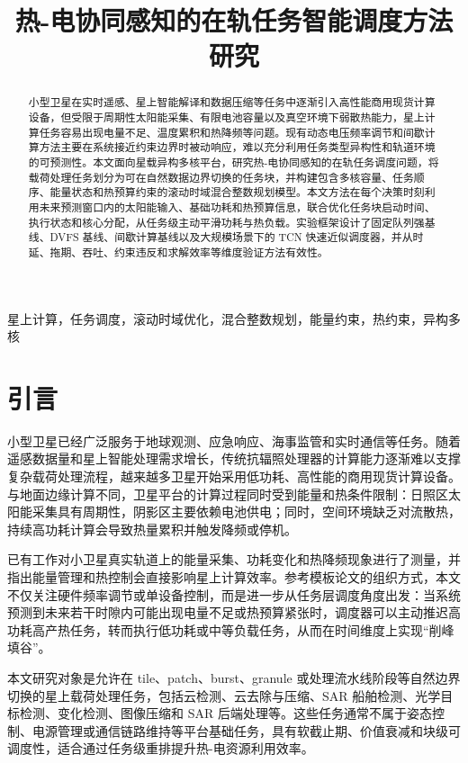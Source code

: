 \documentclass[conference]{IEEEtran}
\title{热-电协同感知的在轨任务智能调度方法研究}
\author{
\IEEEauthorblockN{作者姓名}
\IEEEauthorblockA{
学院/单位名称\\
邮箱：yourname@example.com
}
}
\begin{document}
\maketitle

\begin{abstract}
小型卫星在实时遥感、星上智能解译和数据压缩等任务中逐渐引入高性能商用现货计算设备，但受限于周期性太阳能采集、有限电池容量以及真空环境下弱散热能力，星上计算任务容易出现电量不足、温度累积和热降频等问题。现有动态电压频率调节和间歇计算方法主要在系统接近约束边界时被动响应，难以充分利用任务类型异构性和轨道环境的可预测性。本文面向星载异构多核平台，研究热-电协同感知的在轨任务调度问题，将载荷处理任务划分为可在自然数据边界切换的任务块，并构建包含多核容量、任务顺序、能量状态和热预算约束的滚动时域混合整数规划模型。本文方法在每个决策时刻利用未来预测窗口内的太阳能输入、基础功耗和热预算信息，联合优化任务块启动时间、执行状态和核心分配，从任务级主动平滑功耗与热负载。实验框架设计了固定队列强基线、DVFS 基线、间歇计算基线以及大规模场景下的 TCN 快速近似调度器，并从时延、拖期、吞吐、约束违反和求解效率等维度验证方法有效性。
\end{abstract}

\begin{IEEEkeywords}
星上计算，任务调度，滚动时域优化，混合整数规划，能量约束，热约束，异构多核
\end{IEEEkeywords}

\section{引言}

小型卫星已经广泛服务于地球观测、应急响应、海事监管和实时通信等任务。随着遥感数据量和星上智能处理需求增长，传统抗辐照处理器的计算能力逐渐难以支撑复杂载荷处理流程，越来越多卫星开始采用低功耗、高性能的商用现货计算设备。与地面边缘计算不同，卫星平台的计算过程同时受到能量和热条件限制：日照区太阳能采集具有周期性，阴影区主要依赖电池供电；同时，空间环境缺乏对流散热，持续高功耗计算会导致热量累积并触发降频或停机。

已有工作对小卫星真实轨道上的能量采集、功耗变化和热降频现象进行了测量，并指出能量管理和热控制会直接影响星上计算效率。参考模板论文的组织方式，本文不仅关注硬件频率调节或单设备控制，而是进一步从任务层调度角度出发：当系统预测到未来若干时隙内可能出现电量不足或热预算紧张时，调度器可以主动推迟高功耗高产热任务，转而执行低功耗或中等负载任务，从而在时间维度上实现“削峰填谷”。

本文研究对象是允许在 tile、patch、burst、granule 或处理流水线阶段等自然边界切换的星上载荷处理任务，包括云检测、云去除与压缩、SAR 船舶检测、光学目标检测、变化检测、图像压缩和 SAR 后端处理等。这些任务通常不属于姿态控制、电源管理或通信链路维持等平台基础任务，具有软截止期、价值衰减和块级可调度性，适合通过任务级重排提升热-电资源利用效率。
\end{document}
